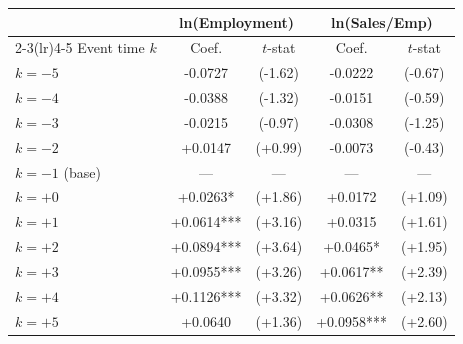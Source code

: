 \begin{tabular}{lcccc}
\toprule
& \multicolumn{2}{c}{ln(Employment)} & \multicolumn{2}{c}{ln(Sales/Emp)} \\
\cmidrule(lr){2-3}\cmidrule(lr){4-5}
Event time $k$ & Coef. & $t$-stat & Coef. & $t$-stat \\
\midrule
$k=-5$ & -0.0727 & (-1.62) & -0.0222 & (-0.67) \\
$k=-4$ & -0.0388 & (-1.32) & -0.0151 & (-0.59) \\
$k=-3$ & -0.0215 & (-0.97) & -0.0308 & (-1.25) \\
$k=-2$ & +0.0147 & (+0.99) & -0.0073 & (-0.43) \\
$k=-1$ (base) & --- & --- & --- & --- \\
$k=+0$ & +0.0263* & (+1.86) & +0.0172 & (+1.09) \\
$k=+1$ & +0.0614*** & (+3.16) & +0.0315 & (+1.61) \\
$k=+2$ & +0.0894*** & (+3.64) & +0.0465* & (+1.95) \\
$k=+3$ & +0.0955*** & (+3.26) & +0.0617** & (+2.39) \\
$k=+4$ & +0.1126*** & (+3.32) & +0.0626** & (+2.13) \\
$k=+5$ & +0.0640 & (+1.36) & +0.0958*** & (+2.60) \\
\bottomrule
\end{tabular}